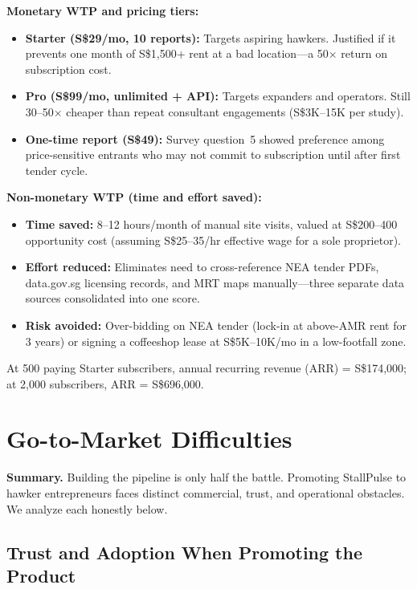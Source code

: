 \documentclass[11pt,a4paper]{article}
\begin{document}
\textbf{Monetary WTP and pricing tiers:}
\begin{itemize}
  \item \textbf{Starter (S\$29/mo, 10 reports):} Targets aspiring hawkers. Justified if it prevents one month of S\$1,500+ rent at a bad location---a 50$\times$ return on subscription cost.
  \item \textbf{Pro (S\$99/mo, unlimited + API):} Targets expanders and operators. Still 30--50$\times$ cheaper than repeat consultant engagements (S\$3K--15K per study).
  \item \textbf{One-time report (S\$49):} Survey question~5 showed preference among price-sensitive entrants who may not commit to subscription until after first tender cycle.
\end{itemize}

\textbf{Non-monetary WTP (time and effort saved):}
\begin{itemize}
  \item \textbf{Time saved:} 8--12 hours/month of manual site visits, valued at S\$200--400 opportunity cost (assuming S\$25--35/hr effective wage for a sole proprietor).
  \item \textbf{Effort reduced:} Eliminates need to cross-reference NEA tender PDFs, data.gov.sg licensing records, and MRT maps manually---three separate data sources consolidated into one score.
  \item \textbf{Risk avoided:} Over-bidding on NEA tender (lock-in at above-AMR rent for 3 years) or signing a coffeeshop lease at S\$5K--10K/mo in a low-footfall zone.
\end{itemize}

At 500 paying Starter subscribers, annual recurring revenue (ARR) = S\$174,000; at 2,000 subscribers, ARR = S\$696,000.

\section{Go-to-Market Difficulties}
\label{sec:gtm}

\noindent\textbf{Summary.} Building the pipeline is only half the battle. Promoting StallPulse to hawker entrepreneurs faces distinct commercial, trust, and operational obstacles. We analyze each honestly below.

\subsection{Trust and Adoption When Promoting the Product}
\end{document}
